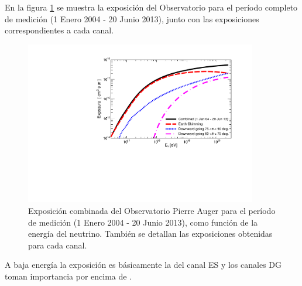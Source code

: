	En la figura \ref{fig:expTot} se muestra la exposición del Observatorio para el período completo de medición (1 Enero 2004 - 20 Junio 2013), junto con las exposiciones correspondientes a cada canal. 
	\begin{figure}[ht!]
		\begin{center}
			\includegraphics[width=0.9\textwidth]{fig/resultadosAuger/exposure_combined_ageing}
			\caption{Exposición combinada del Observatorio Pierre Auger para el período de medición (1 Enero 2004 - 20 Junio 2013), como función de la energía del neutrino. También se detallan las exposiciones obtenidas para cada canal.}
			\label{fig:expTot}
		\end{center}
	\end{figure}
	A baja energía la exposición es básicamente la del canal ES y los canales DG toman importancia por encima de .
	
